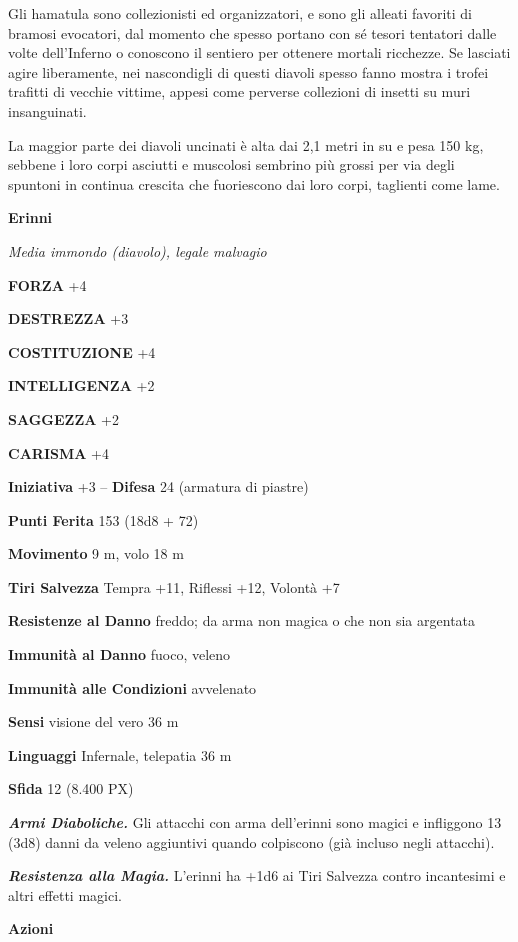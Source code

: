 \begin{multicols}{2}
	Gli hamatula sono collezionisti ed organizzatori, e sono gli alleati favoriti di bramosi evocatori, dal momento che spesso portano con sé tesori tentatori dalle volte dell'Inferno o conoscono il sentiero per ottenere mortali ricchezze. Se lasciati agire liberamente, nei nascondigli di questi diavoli spesso fanno mostra i trofei trafitti di vecchie vittime, appesi come perverse collezioni di insetti su muri insanguinati.

	La maggior parte dei diavoli uncinati è alta dai 2,1 metri in su e pesa 150 kg, sebbene i loro corpi asciutti e muscolosi sembrino più grossi per via degli spuntoni in continua crescita che fuoriescono dai loro corpi, taglienti come lame.

	\medskip{}\textbf{Erinni}

	\textit{Media immondo (diavolo), legale malvagio}

	\textbf{FORZA} +4

	\textbf{DESTREZZA} +3

	\textbf{COSTITUZIONE} +4

	\textbf{INTELLIGENZA} +2

	\textbf{SAGGEZZA} +2

	\textbf{CARISMA} +4

	\textbf{Iniziativa} +3 -- \textbf{Difesa} 24 (armatura di piastre)

	\textbf{Punti Ferita} 153 (18d8 + 72)

	\textbf{Movimento} 9 m, volo 18 m

	\textbf{Tiri Salvezza} Tempra +11, Riflessi +12, Volontà +7

	\textbf{Resistenze al Danno} freddo; da arma non magica o che non sia argentata

	\textbf{Immunità al Danno} fuoco, veleno

	\textbf{Immunità alle Condizioni} avvelenato

	\textbf{Sensi} visione del vero 36 m

	\textbf{Linguaggi} Infernale, telepatia 36 m

	\textbf{Sfida} 12 (8.400 PX)

	\textit{\textbf{Armi Diaboliche.}} Gli attacchi con arma dell'erinni sono magici e infliggono 13 (3d8) danni da veleno aggiuntivi quando colpiscono (già incluso negli attacchi).

	\textit{\textbf{Resistenza alla Magia.}} L'erinni ha +1d6 ai Tiri Salvezza contro incantesimi e altri effetti magici.

	\textbf{Azioni}


\end{multicols}
